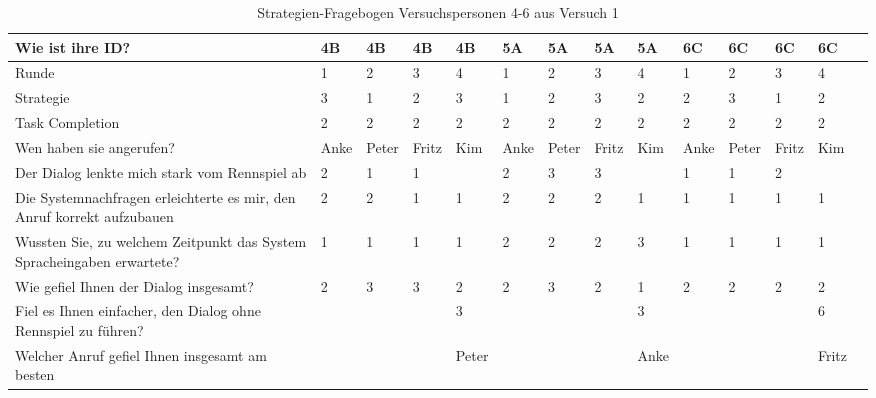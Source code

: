 \documentclass[12pt,a4paper]{scrartcl}
\begin{document}
\begin{appendix}
\begin{table}
\caption{Strategien-Fragebogen Versuchspersonen 4-6 aus Versuch 1}
\begin{tabular}{|p{6cm}| p{0.8cm} | p{0.8cm} | p{0.8cm} | p{0.8cm} || p{0.8cm} | p{0.8cm} | p{0.8cm} | p{0.8cm} || p{0.8cm} | p{0.8cm} | p{0.8cm} | p{0.8cm} | p{} | }
\hline
	Wie ist ihre ID? & 4B & 4B & 4B & 4B & 5A & 5A & 5A & 5A & 6C & 6C & 6C & 6C \\ \hline \hline
	Runde & 1 & 2 & 3 & 4 & 1 & 2 & 3 & 4 & 1 & 2 & 3 & 4 \\ \hline
	Strategie & 3 & 1 & 2 & 3 & 1 & 2 & 3 & 2 & 2 & 3 & 1 & 2 \\ \hline \hline
	Task Completion & 2 & 2 & 2 & 2 & 2 & 2 & 2 & 2 & 2 & 2 & 2 & 2 \\ \hline \hline
	Wen haben sie angerufen? & Anke & Peter & Fritz & Kim & Anke & Peter & Fritz & Kim & Anke & Peter & Fritz & Kim \\ \hline
	Der Dialog lenkte mich stark vom Rennspiel ab & 2 & 1 & 1 &  & 2 & 3 & 3 &  & 1 & 1 & 2 &  \\ \hline
	Die Systemnachfragen erleichterte es mir, den Anruf korrekt aufzubauen & 2 & 2 & 1 & 1 & 2 & 2 & 2 & 1 & 1 & 1 & 1 & 1 \\ \hline
	Wussten Sie, zu welchem Zeitpunkt das System Spracheingaben erwartete? & 1 & 1 & 1 & 1 & 2 & 2 & 2 & 3 & 1 & 1 & 1 & 1 \\ \hline
	Wie gefiel Ihnen der Dialog insgesamt? & 2 & 3 & 3 & 2 & 2 & 3 & 2 & 1 & 2 & 2 & 2 & 2 \\ \hline
	Fiel es Ihnen einfacher, den Dialog ohne Rennspiel zu führen? &  &  &  & 3 &  &  &  & 3 &  &  &  & 6 \\ \hline
	Welcher Anruf gefiel Ihnen insgesamt am besten &  &  &  & Peter  &  &  &  & Anke &  &  &  & Fritz \\ \hline
\end{tabular}
\end{table}


\end{appendix}
\end{document}
